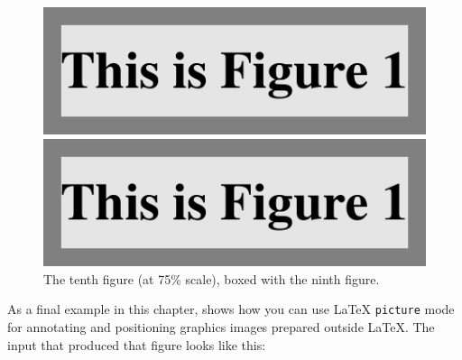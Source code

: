 \begin{figure}[t]
    \centerline{\includegraphics[scale = 0.5]{fig1}}
    \caption[The ninth figure (at 50\% scale)]%
            {The ninth figure (at 50\% scale), boxed with the tenth figure.}

    \vspace{3ex}

    \centerline{\includegraphics[scale = 0.75]{fig1}}
    \caption[The tenth figure (at 75\% scale)]%
            {The tenth figure (at 75\% scale), boxed with the ninth figure.}%
\end{figure}

\blah

\blah

\blah

As a final example in this chapter, 
shows how you can use \LaTeX{} \texttt{picture} mode for
annotating and positioning graphics images prepared outside
\LaTeX{}.  The input that produced that figure looks like
this:


